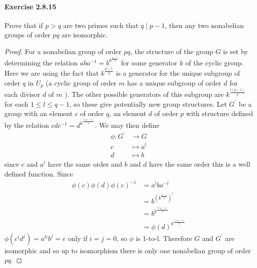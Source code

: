 \documentclass{article}
\begin{document}
\paragraph{Exercise 2.8.15} Prove that if $p > q$ are two primes such that $q \mid p - 1$, then any two nonabelian groups of order $pq$ are isomorphic.
\begin{proof}
    For a nonabelian group of order $p q$, the structure of the group $G$ is set by determining the relation $a b a^{-1}=b^{k^{\frac{p-1}{q}}}$ for some generator $k$ of the cyclic group. Here we are using the fact that $k^{\frac{p-1}{q}}$ is a generator for the unique subgroup of order $q$ in $U_p$ (a cyclic group of order $m$ has a unique subgroup of order $d$ for each divisor $d$ of $m$ ). The other possible generators of this subgroup are $k^{\frac{l(p-1)}{q}}$ for each $1 \leq l \leq q-1$, so these give potentially new group structures. Let $G^{\prime}$ be a group with an element $c$ of order $q$, an element $d$ of order $p$ with structure defined by the relation $c d c^{-1}=d^{k^{\frac{l(p-1)}{q}}}$. We may then define
$$
\begin{aligned}
\phi: G^{\prime} & \rightarrow G \\
c & \mapsto a^l \\
d & \mapsto b
\end{aligned}
$$
since $c$ and $a^l$ have the same order and $b$ and $d$ have the same order this is a well defined function.
Since
$$
\begin{aligned}
\phi(c) \phi(d) \phi(c)^{-1} & =a^l b a^{-l} \\
& =b^{\left(k^{\frac{p-1}{q}}\right)^l} \\
& =b^{k^{\frac{l(p-1)}{q}}} \\
& =\phi(d)^{k^{\frac{l(p-1)}{q}}}
\end{aligned}
$$
$\phi\left(c^i d^j\right)=a^{l i} b^j=e$ only if $i=j=0$, so $\phi$ is 1-to-l. Therefore $G$ and $G^{\prime}$ are isomorphic and so up to isomorphism there is only one nonabelian group of order $p q$.
\end{proof}
\end{document}
